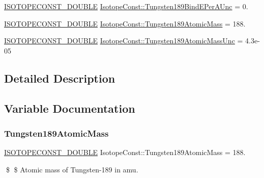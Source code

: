 \begin{DoxyCompactItemize}
\mbox{\hyperlink{group___isotope_const-_macros_ga8f45a7272ce02c0b4c65c44636ed719a}{I\+S\+O\+T\+O\+P\+E\+C\+O\+N\+S\+T\+\_\+\+D\+O\+U\+B\+LE}} \mbox{\hyperlink{group___isotope_const-_tungsten-_w189_ga30d8acdaeb64dd8ee4100e7bdae44c91}{Isotope\+Const\+::\+Tungsten189\+Bind\+E\+Per\+A\+Unc}} = 0.
\item 
\mbox{\hyperlink{group___isotope_const-_macros_ga8f45a7272ce02c0b4c65c44636ed719a}{I\+S\+O\+T\+O\+P\+E\+C\+O\+N\+S\+T\+\_\+\+D\+O\+U\+B\+LE}} \mbox{\hyperlink{group___isotope_const-_tungsten-_w189_gac591ee2e672074c9793ead276f293c4f}{Isotope\+Const\+::\+Tungsten189\+Atomic\+Mass}} = 188.
\item 
\mbox{\hyperlink{group___isotope_const-_macros_ga8f45a7272ce02c0b4c65c44636ed719a}{I\+S\+O\+T\+O\+P\+E\+C\+O\+N\+S\+T\+\_\+\+D\+O\+U\+B\+LE}} \mbox{\hyperlink{group___isotope_const-_tungsten-_w189_ga74725810140bf0697231977ff1f38583}{Isotope\+Const\+::\+Tungsten189\+Atomic\+Mass\+Unc}} = 4.\+3e-\/05
\end{DoxyCompactItemize}


\subsection{Detailed Description}


\subsection{Variable Documentation}
\mbox{\label{group___isotope_const-_tungsten-_w189_gac591ee2e672074c9793ead276f293c4f}} 
\subsubsection{\texorpdfstring{Tungsten189\+Atomic\+Mass}{Tungsten189AtomicMass}}
{\footnotesize\ttfamily \mbox{\hyperlink{group___isotope_const-_macros_ga8f45a7272ce02c0b4c65c44636ed719a}{I\+S\+O\+T\+O\+P\+E\+C\+O\+N\+S\+T\+\_\+\+D\+O\+U\+B\+LE}} Isotope\+Const\+::\+Tungsten189\+Atomic\+Mass = 188.}

\$ \$ Atomic mass of Tungsten-\/189 in amu. \mbox{\label{group___isotope_const-_tungsten-_w189_ga74725810140bf0697231977ff1f38583}} 

